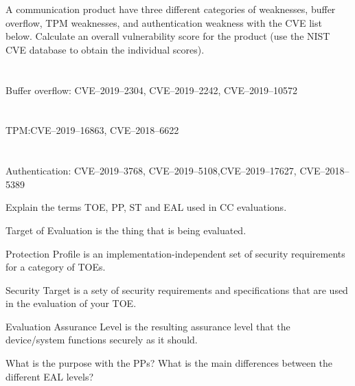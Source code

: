 \begin{questions}
\question{} A communication product have three different categories of weaknesses, buffer overflow, TPM weaknesses, and authentication weakness with the CVE list below. Calculate an overall vulnerability score for the product (use the NIST CVE database to obtain the individual scores).
  \begin{parts}
  \part{} Buffer overflow: CVE--2019--2304, CVE--2019--2242, CVE--2019--10572
  \part{} TPM:\@ CVE--2019--16863, CVE--2018--6622
  \part{} Authentication: CVE--2019--3768, CVE--2019--5108,CVE--2019--17627, CVE--2018--5389
  \end{parts}

\question{} Explain the terms TOE, PP, ST and EAL used in CC evaluations.
  \begin{solution}
    \begin{description}[noitemsep]
    \item[TOE] Target of Evaluation is the thing that is being evaluated.
    \item[PP] Protection Profile is an implementation-independent set of security requirements for a category of TOEs.
    \item[ST] Security Target is a sety of security requirements and specifications that are used in the evaluation of your TOE.\@
    \item[EAL] Evaluation Assurance Level is the resulting assurance level that the device/system functions securely as it should.
    \end{description}
  \end{solution}

\question{} What is the purpose with the PPs?
\question{} What is the main differences between the different EAL levels?
\end{questions}

